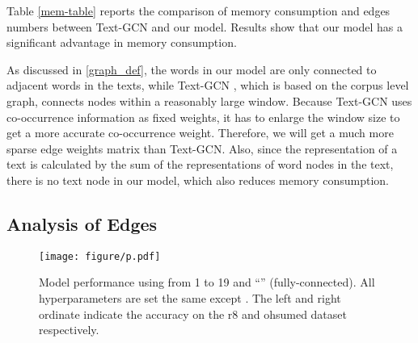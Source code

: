 \documentclass[11pt,a4paper]{article}
\begin{document}
Table \ref{mem-table} reports the comparison of memory consumption and edges numbers between Text-GCN and our model. Results show that our model has a significant advantage in memory consumption. 

As discussed in \ref{graph_def}, the words in our model are only connected to adjacent words in the texts, while Text-GCN , which is based on the corpus level graph, connects nodes within a reasonably large window. Because Text-GCN uses co-occurrence information as fixed weights, it has to enlarge the window size to get a more accurate co-occurrence weight. Therefore, we will get a much more sparse edge weights matrix than Text-GCN. Also, since the representation of a text is calculated by the sum of the representations of word nodes in the text, there is no text node in our model, which also reduces memory consumption. 






\subsection{Analysis of Edges}
\begin{figure}[t]
    \centering
    \texttt{[image: figure/p.pdf]}
    \caption{Model performance using  from 1 to 19 and ``'' (fully-connected). All hyperparameters are set the same except . The left and right ordinate indicate the accuracy on the r8 and ohsumed dataset respectively.}
    \label{fig:p}
\end{figure} 
\end{document}
